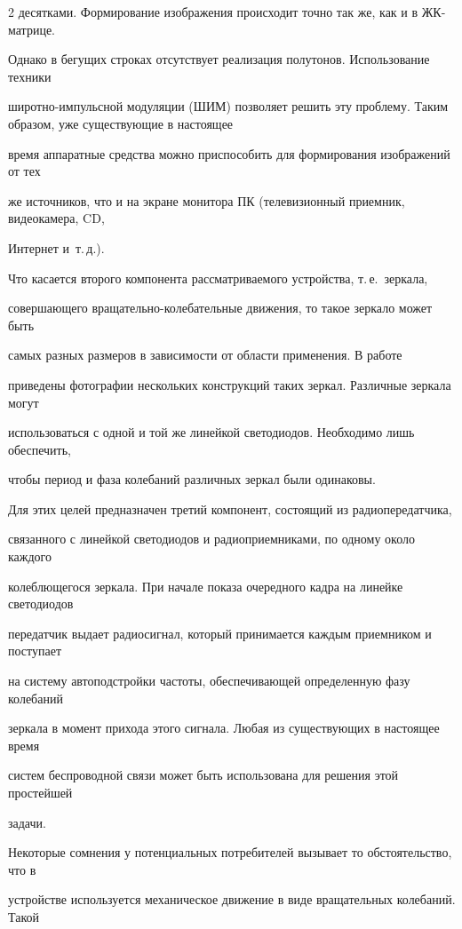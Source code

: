 \begin{multicols}{2}
десятками. Формирование изображения происходит точно так же, как и в ЖК-матрице. 

Однако в бегущих строках отсутствует реализация полутонов. Использование техники 

широтно-импульсной модуляции (ШИМ) позволяет решить эту проблему. Таким образом, уже существующие в настоящее 

время аппаратные средства можно приспособить для формирования изображений от тех 

же источников, что и на экране монитора ПК (телевизионный приемник, видеокамера, CD, 

Интернет и~т.\,д.). 

  

  Что касается второго компонента рассматриваемого устройства, т.\,е.\ зеркала, 

совершающего вращательно-колебательные движения, то такое зеркало может быть 

самых разных размеров в зависимости от области применения. В работе~\cite{2t} 

приведены фотографии нескольких конструкций таких зеркал. Различные зеркала могут 

использоваться с одной и той же линейкой светодиодов. Необходимо лишь обеспечить, 

чтобы период и фаза колебаний различных зеркал были одинаковы. 

  

  Для этих целей предназначен третий компонент, состоящий из радиопередатчика, 

связанного с линейкой светодиодов и радиоприемниками, по одному около каждого 

колеблющегося зеркала. При начале показа очередного кадра на линейке светодиодов 

передатчик выдает радиосигнал, который принимается каждым приемником и поступает 

на систему автоподстройки частоты, обеспечивающей определенную фазу колебаний 

зеркала в момент прихода этого сигнала. Любая из существующих в настоящее время 

систем беспроводной связи может быть использована для решения этой простейшей 

задачи. 

  

  Некоторые сомнения у потенциальных потребителей вызывает то обстоятельство, что в 

устройстве используется механическое движение в виде вращательных колебаний. Такой 


\end{multicols}
